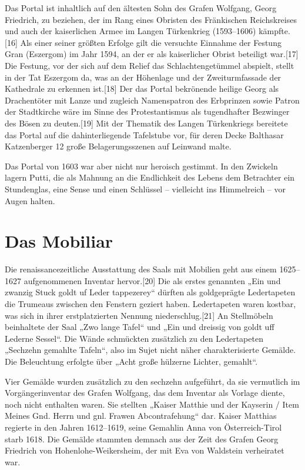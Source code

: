 \documentclass[
  letterpaper,
]{book}
\begin{document}
Das Portal ist inhaltlich auf den ältesten Sohn des Grafen Wolfgang,
Georg Friedrich, zu beziehen, der im Rang eines Obristen des Fränkischen
Reichskreises und auch der kaiserlichen Armee im Langen Türkenkrieg
(1593--1606) kämpfte.{[}16{]} Als einer seiner größten Erfolge gilt die
versuchte Einnahme der Festung Gran (Eszergom) im Jahr 1594, an der er
als kaiserlicher Obrist beteiligt war.{[}17{]} Die Festung, vor der sich
auf dem Relief das Schlachtengetümmel abspielt, stellt in der Tat
Eszergom da, was an der Höhenlage und der Zweiturmfassade der Kathedrale
zu erkennen ist.{[}18{]} Der das Portal bekrönende heilige Georg als
Drachentöter mit Lanze und zugleich Namenspatron des Erbprinzen sowie
Patron der Stadtkirche wäre im Sinne des Protestantismus als
tugendhafter Bezwinger des Bösen zu deuten.{[}19{]} Mit der Thematik des
Langen Türkenkriegs bereitete das Portal auf die dahinterliegende
Tafelstube vor, für deren Decke Balthasar Katzenberger 12 große
Belagerungsszenen auf Leinwand malte.

Das Portal von 1603 war aber nicht nur heroisch gestimmt. In den
Zwickeln lagern Putti, die als Mahnung an die Endlichkeit des Lebens dem
Betrachter ein Stundenglas, eine Sense und einen Schlüssel -- vielleicht
ins Himmelreich -- vor Augen halten.

\section{Das Mobiliar}\label{das-mobiliar}

Die renaissancezeitliche Ausstattung des Saals mit Mobilien geht aus
einem 1625--1627 aufgenommenen Inventar hervor.{[}20{]} Die als erstes
genannten „Ein und zwanzig Stuck goldt uf Leder tappezerey`` dürften als
goldgeprägte Ledertapeten die Trumeaus zwischen den Fenstern geziert
haben. Ledertapeten waren kostbar, was sich in ihrer erstplatzierten
Nennung niederschlug.{[}21{]} An Stellmöbeln beinhaltete der Saal „Zwo
lange Tafel`` und „Ein und dreissig von goldt uff Lederne Sessel``. Die
Wände schmückten zusätzlich zu den Ledertapeten „Sechzehn gemahlte
Tafeln``, also im Sujet nicht näher charakterisierte Gemälde. Die
Beleuchtung erfolgte über „Acht große hülzerne Lichter, gemahlt``.

Vier Gemälde wurden zusätzlich zu den sechzehn aufgeführt, da sie
vermutlich im Vorgängerinventar des Grafen Wolfgang, das dem Inventar
als Vorlage diente, noch nicht enthalten waren. Sie stellten „Kaiser
Matthie und der Kayserin / Item Meines Gnd. Herrn und gnl. Frawen
Abcontrafehung`` dar. Kaiser Matthias regierte in den Jahren 1612--1619,
seine Gemahlin Anna von Österreich-Tirol starb 1618. Die Gemälde
stammten demnach aus der Zeit des Grafen Georg Friedrich von
Hohenlohe-Weikersheim, der mit Eva von Waldstein verheiratet war.
\end{document}
